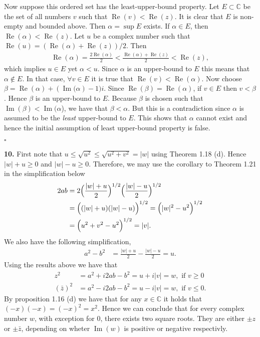 \documentclass[11pt]{article}
\DeclareMathOperator{\VarRe}{Re}
\DeclareMathOperator{\VarIm}{Im}
\begin{document}
Now suppose this ordered set has the least-upper-bound property.
Let $E \subset \mathbb{C}$ be the set of all numbers $v$ such that $\VarRe(v) < \VarRe(z)$.
It is clear that $E$ is non-empty and bounded above.
Then $\alpha = \sup{E}$ exists.
If $\alpha \in E$, then $\VarRe(\alpha) < \VarRe(z)$. Let $u$ be a complex number such that
$\VarRe(u) = (\VarRe(\alpha) + \VarRe(z)) / 2$. Then
\begin{align*}
  \VarRe(\alpha) = \frac{2\VarRe(\alpha)}{2} < \frac{\VarRe(\alpha) + \VarRe(z)}{2} < \VarRe(z),
\end{align*}
which implies $u \in E$ yet $\alpha < u$.
Since $\alpha$ is an upper-bound to $E$ this means that $\alpha \notin E$.
In that case, $\forall v \in E$ it is true that $\VarRe(v) < \VarRe(\alpha)$.
Now choose $\beta = \VarRe({\alpha}) + (\VarIm{(\alpha}) - 1)i$.
Since $\VarRe(\beta) = \VarRe(\alpha)$, if $v\in E$ then $v < \beta$.
Hence $\beta$ is an upper-bound to $E$.
Because $\beta$ is chosen such that $\VarIm(\beta) < \VarIm(\alpha$), we  have that $\beta < \alpha$.
But this is a contradiction since $\alpha$ is assumed to be the \emph{least} upper-bound to $E$.
This shows that $\alpha$ cannot exist and hence the initial assumption of least upper-bound property is false.

\hfill$\square$

\noindent\textbf{10.} First note that $u \leq \sqrt{u^2} \leq \sqrt{u^2 + v^2} = |w|$ using Theorem 1.18 (d).
Hence $|w|+u \geq 0$ and $|w| - u \geq 0$.
Therefore, we may use the corollary to Theorem 1.21 in the simplification below
\begin{align*}
  2ab &= 2\Bigl( \frac{|w| + u}{2} \Bigr)^{1/2} \Bigl( \frac{|w| - u}{2} \Bigr)^{1/2} \\
      &= \Bigl( (|w| + u)(|w| - u) \Bigr)^{1/2} = \Bigl( |w|^2 - u^2 \Bigr)^{1/2}\\
      &= \Bigl( u^2 + v^2 - u^2 \Bigr)^{1/2} = |v|.
\end{align*}
We also have the following simplification,
\begin{align*}
  a^2 - b^2 &= \frac{|w| + u}{2} - \frac{|w| - u}{2} = u.
\end{align*}
Using the results above we have that
\begin{align*}
  z^2 &= a^2 + i2ab - b^2 = u + i|v| = w, \textrm{ if } v \geq 0 \\
  (\bar{z})^2 &= a^2 - i2ab - b^2 = u - i|v| = w, \textrm{ if } v \leq 0.
\end{align*}
By proposition 1.16 (d) we have that for any $x\in \mathbb{C}$ it holds that $(-x)(-x) = (-x)^2 = x^2$.
Hence we can conclude that for every complex number $w$, with exception for $0$, there exists two square roots.
They are either $\pm z$ or $\pm\bar{z}$, depending on wheter $\VarIm(w)$ is positive or negative respectivly.
\end{document}
